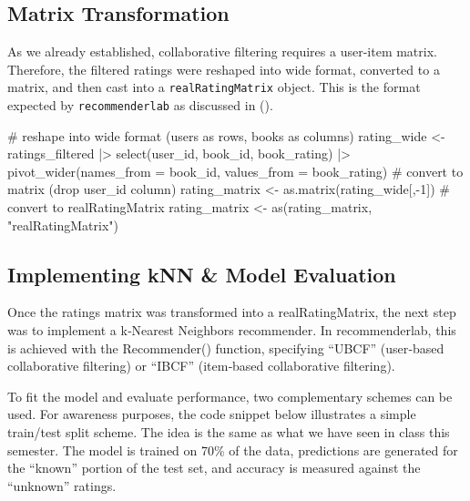 \documentclass[
  12pt]{article}
\newenvironment{Shaded}{\begin{snugshade}}{\end{snugshade}}
\newcommand{\AttributeTok}[1]{\textcolor[rgb]{0.40,0.45,0.13}{#1}}
\newcommand{\CommentTok}[1]{\textcolor[rgb]{0.37,0.37,0.37}{#1}}
\newcommand{\DecValTok}[1]{\textcolor[rgb]{0.68,0.00,0.00}{#1}}
\newcommand{\FunctionTok}[1]{\textcolor[rgb]{0.28,0.35,0.67}{#1}}
\newcommand{\NormalTok}[1]{\textcolor[rgb]{0.00,0.23,0.31}{#1}}
\newcommand{\OtherTok}[1]{\textcolor[rgb]{0.00,0.23,0.31}{#1}}
\newcommand{\SpecialCharTok}[1]{\textcolor[rgb]{0.37,0.37,0.37}{#1}}
\newcommand{\StringTok}[1]{\textcolor[rgb]{0.13,0.47,0.30}{#1}}
\begin{document}
\subsection{\texorpdfstring{\textbf{Matrix
Transformation}}{Matrix Transformation}}\label{matrix-transformation}

As we already established, collaborative filtering requires a user-item
matrix. Therefore, the filtered ratings were reshaped into wide format,
converted to a matrix, and then cast into a \texttt{realRatingMatrix}
object. This is the format expected by \texttt{recommenderlab} as
discussed in (\citet{recommenderlabdocs2025}).

\begin{Shaded}
\begin{Highlighting}[]
\CommentTok{\# reshape into wide format (users as rows, books as columns)}
\NormalTok{rating\_wide }\OtherTok{\textless{}{-}}\NormalTok{ ratings\_filtered }\SpecialCharTok{|\textgreater{}}
  \FunctionTok{select}\NormalTok{(user\_id, book\_id, book\_rating) }\SpecialCharTok{|\textgreater{}}
  \FunctionTok{pivot\_wider}\NormalTok{(}\AttributeTok{names\_from =}\NormalTok{ book\_id, }\AttributeTok{values\_from =}\NormalTok{ book\_rating)}
\CommentTok{\# convert to matrix (drop user\_id column)}
\NormalTok{rating\_matrix }\OtherTok{\textless{}{-}} \FunctionTok{as.matrix}\NormalTok{(rating\_wide[,}\SpecialCharTok{{-}}\DecValTok{1}\NormalTok{])}
\CommentTok{\# convert to realRatingMatrix}
\NormalTok{rating\_matrix }\OtherTok{\textless{}{-}} \FunctionTok{as}\NormalTok{(rating\_matrix, }\StringTok{"realRatingMatrix"}\NormalTok{)}
\end{Highlighting}
\end{Shaded}

\subsection{\texorpdfstring{\textbf{Implementing kNN \& Model
Evaluation}}{Implementing kNN \& Model Evaluation}}\label{implementing-knn-model-evaluation}

Once the ratings matrix was transformed into a realRatingMatrix, the
next step was to implement a k‑Nearest Neighbors recommender. In
recommenderlab, this is achieved with the Recommender() function,
specifying ``UBCF'' (user‑based collaborative filtering) or ``IBCF''
(item‑based collaborative filtering).

To fit the model and evaluate performance, two complementary schemes can
be used. For awareness purposes, the code snippet below illustrates a
simple train/test split scheme. The idea is the same as what we have
seen in class this semester. The model is trained on 70\% of the data,
predictions are generated for the ``known'' portion of the test set, and
accuracy is measured against the ``unknown'' ratings.
\end{document}
